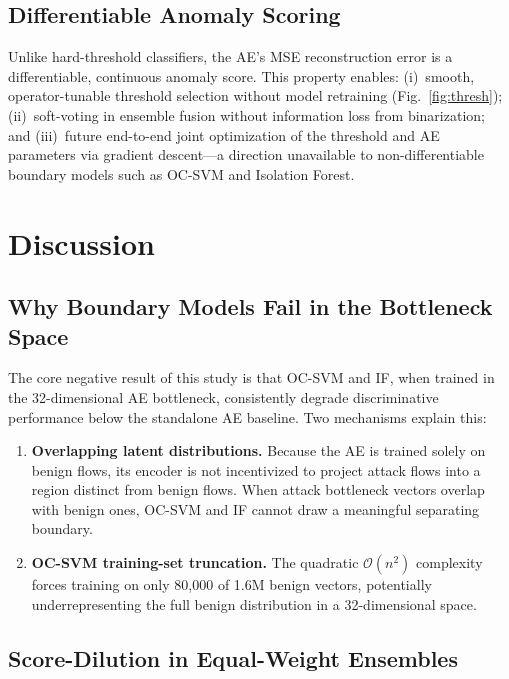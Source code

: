 \documentclass[10pt,journal,compsoc]{IEEEtran}
\begin{document}
\subsection{Differentiable Anomaly Scoring}

Unlike hard-threshold classifiers, the AE's MSE reconstruction error
is a differentiable, continuous anomaly score.  This property enables:
(i)~smooth, operator-tunable threshold selection without model
retraining (Fig.~\ref{fig:thresh}); (ii)~soft-voting in ensemble
fusion without information loss from binarization; and (iii)~future
end-to-end joint optimization of the threshold and AE parameters via
gradient descent---a direction unavailable to non-differentiable
boundary models such as OC-SVM and Isolation Forest.

\section{Discussion}
\label{sec:discussion}

\subsection{Why Boundary Models Fail in the Bottleneck Space}

The core negative result of this study is that OC-SVM and IF, when
trained in the 32-dimensional AE bottleneck, consistently degrade
discriminative performance below the standalone AE baseline.  Two
mechanisms explain this:

\begin{enumerate}[leftmargin=*,noitemsep]
  \item \textbf{Overlapping latent distributions.}  Because the AE
    is trained solely on benign flows, its encoder is not incentivized
    to project attack flows into a region distinct from benign flows.
    When attack bottleneck vectors overlap with benign ones, OC-SVM
    and IF cannot draw a meaningful separating boundary.
  \item \textbf{OC-SVM training-set truncation.}  The quadratic
    $\mathcal{O}(n^2)$ complexity forces training on only 80{,}000
    of 1.6M benign vectors, potentially underrepresenting the full
    benign distribution in a 32-dimensional space.
\end{enumerate}

\subsection{Score-Dilution in Equal-Weight Ensembles}
\end{document}
